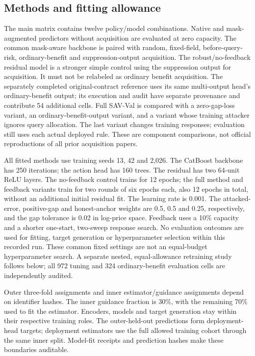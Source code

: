 \subsection{Methods and fitting allowance}
The main matrix contains twelve policy/model combinations. Native and
mask-augmented predictors without acquisition are evaluated at zero
capacity. The common mask-aware backbone is paired with random, fixed-field,
before-query-risk, ordinary-benefit and suppression-output acquisition.
The robust/no-feedback residual model is a stronger simple control using
the suppression output for acquisition. It must not be relabeled as ordinary
benefit acquisition. The separately completed original-contract reference
uses its same multi-output head's ordinary-benefit output; its execution and
audit have separate provenance and contribute 54 additional cells. Full
SAV-Val is compared with a zero-gap-loss variant, an ordinary-benefit-output
variant, and a variant whose training attacker ignores query allocation.
The last variant changes training responses; evaluation still uses each
actual deployed rule. These are component comparisons, not official
reproductions of all prior acquisition papers.

All fitted methods use training seeds 13, 42 and 2,026. The CatBoost
backbone has 250 iterations; the action head has 160 trees. The residual
has two 64-unit ReLU layers. The no-feedback control trains for 12 epochs;
the full method and feedback variants train for two rounds of six epochs
each, also 12 epochs in total, without an additional initial residual fit.
The learning rate is 0.001. The attacked-error,
positive-gap and honest-anchor weights are 0.5, 0.5 and 0.25, respectively,
and the gap tolerance is 0.02 in log-price space. Feedback uses a 10\%
capacity and a shorter one-start, two-sweep response search. No evaluation
outcomes are used for fitting, target generation or hyperparameter
selection within this recorded run. These common fixed settings are not
an equal-budget hyperparameter search. A separate nested, equal-allowance
retraining study follows below; all 972 tuning and 324 ordinary-benefit
evaluation cells are independently audited.

Outer three-fold assignments and inner estimator/guidance assignments
depend on identifier hashes. The inner guidance fraction is 30\%, with
the remaining 70\% used to fit the estimator. Encoders, models and target
generation stay within their respective training roles. The outer-held-out
predictions form deployment-head targets; deployment estimators use the
full allowed training cohort through the same inner split. Model-fit
receipts and prediction hashes make these boundaries auditable.

